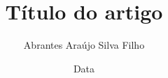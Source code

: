 \documentclass[pdftex, brazil, 12pt, twoside]{article}
\begin{document}
\title{Título do artigo}
\author{Abrantes Araújo Silva Filho}
\date{Data}
\maketitle





\appendix





\printindex


\end{document}
